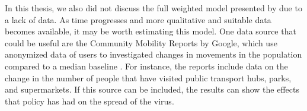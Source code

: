 \documentclass[12pt]{article}
\begin{document}
	In this thesis, we also did not discuss the full weighted model presented by \textcite{adda2016economic} due to a lack of data. As time progresses and more qualitative and suitable data becomes available, it may be worth estimating this model. One data source that could be useful are the Community Mobility Reports by Google, which use anonymized data of users to investigated changes in movements in the population compared to a median baseline \parencite{google_mobility_report}. For instance, the reports include data on the change in the number of people that have visited public transport hubs, parks, and supermarkets. If this source can be included, the results can show the effects that policy has had on the spread of the virus. \\
	
	

	
	
	
	\newpage
	\printbibliography
	
	\newpage
	\appendix
	
\end{document}
